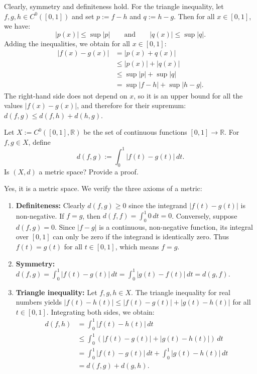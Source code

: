 \begin{exercisesolution}
Clearly, symmetry and definiteness hold. For the triangle inequality, let $f, g, h \in C^0([0,1])$ and
set $p := f - h$ and $q := h - g$. Then for all $x \in [0,1]$, we have:
\[|p(x)| \leq \sup|p| \qquad \text{and} \qquad |q(x)| \leq \sup|q|.\]
Adding the inequalities, we obtain for all $x \in [0,1]$:
\begin{align*}
|f(x) - g(x)| &= |p(x) + q(x)| \\
&\leq |p(x)| + |q(x)| \\
&\leq \sup|p| + \sup|q| \\
&= \sup|f - h| + \sup|h - g|.
\end{align*}
The right-hand side does not depend on $x$, so it is an upper bound for all the values
$|f(x)-g(x)|$, and therefore for their supremum: $d(f,g) \leq d(f,h) + d(h,g)$.
\end{exercisesolution}

\begin{exercise}[$L^1$-metric]
\label{ex:integral_metric_is_metric}
Let $X := C^0([0,1], \mathbb{R})$ be the set of continuous functions $[0,1] \to \mathbb{R}$.
For $f,g \in X$, define
\[d(f,g) := \int_0^1 \lvert f(t)-g(t)\rvert\,dt.\]
Is $(X,d)$ a metric space? Provide a proof.
\end{exercise}

\begin{exercisesolution}
Yes, it is a metric space. We verify the three axioms of a metric:
\begin{enumerate}[label=\textbf{(\alph*)}]
  \item \textbf{Definiteness:} Clearly $d(f,g) \geq 0$ since the integrand $\lvert f(t)-g(t)\rvert$ is non-negative. If $f = g$, then $d(f,f) = \int_0^1 0\,dt = 0$. Conversely, suppose $d(f,g) = 0$. Since $\lvert f-g\rvert$ is a continuous, non-negative function, its integral over $[0,1]$ can only be zero if the integrand is identically zero. Thus $f(t) = g(t)$ for all $t \in [0,1]$, which means $f = g$.
  \item \textbf{Symmetry:} $d(f,g) = \int_0^1 \lvert f(t)-g(t)\rvert\,dt = \int_0^1 \lvert g(t)-f(t)\rvert\,dt = d(g,f)$.
  \item \textbf{Triangle inequality:} Let $f, g, h \in X$. The triangle inequality for real numbers yields $\lvert f(t)-h(t)\rvert \leq \lvert f(t)-g(t)\rvert + \lvert g(t)-h(t)\rvert$ for all $t \in [0,1]$. Integrating both sides, we obtain:
  \begin{align*}
  d(f,h) &= \int_0^1 \lvert f(t)-h(t)\rvert\,dt \\
  &\leq \int_0^1 \left(\lvert f(t)-g(t)\rvert + \lvert g(t)-h(t)\rvert\right)\,dt \\
  &= \int_0^1 \lvert f(t)-g(t)\rvert\,dt + \int_0^1 \lvert g(t)-h(t)\rvert\,dt \\
  &= d(f,g) + d(g,h).
  \end{align*}
\end{enumerate}
\end{exercisesolution}

